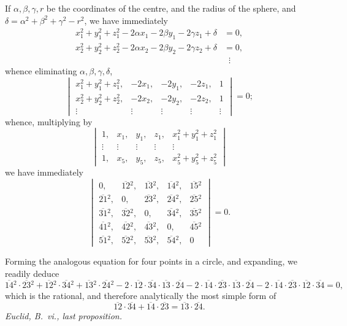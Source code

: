 \documentclass[11pt]{article}
\begin{document}
If $\alpha, \beta, \gamma, r$ be the coordinates of the centre, and the radius of the sphere, and $\delta = \alpha^2 + \beta^2 + \gamma^2 - r^2$, we have immediately
\[
\begin{aligned}
x_1^2 + y_1^2 + z_1^2 - 2\alpha x_1 - 2\beta y_1 - 2\gamma z_1 + \delta &= 0, \\
x_2^2 + y_2^2 + z_2^2 - 2\alpha x_2 - 2\beta y_2 - 2\gamma z_2 + \delta &= 0, \\
&\;\;\vdots
\end{aligned}
\]
whence eliminating $\alpha, \beta, \gamma, \delta$,
\[
\begin{vmatrix}
x_1^2 + y_1^2 + z_1^2, & -2x_1, & -2y_1, & -2z_1, & 1 \\
x_2^2 + y_2^2 + z_2^2, & -2x_2, & -2y_2, & -2z_2, & 1 \\
\vdots & \vdots & \vdots & \vdots & \vdots
\end{vmatrix} = 0;
\]
whence, multiplying by
\[
\begin{vmatrix}
1, & x_1, & y_1, & z_1, & x_1^2 + y_1^2 + z_1^2 \\
\vdots & \vdots & \vdots & \vdots & \vdots \\
1, & x_5, & y_5, & z_5, & x_5^2 + y_5^2 + z_5^2
\end{vmatrix}
\]
we have immediately
\[
\begin{vmatrix}
0, & \overline{12}{}^2, & \overline{13}{}^2, & \overline{14}{}^2, & \overline{15}{}^2 \\
\overline{21}{}^2, & 0, & \overline{23}{}^2, & \overline{24}{}^2, & \overline{25}{}^2 \\
\overline{31}{}^2, & \overline{32}{}^2, & 0, & \overline{34}{}^2, & \overline{35}{}^2 \\
\overline{41}{}^2, & \overline{42}{}^2, & \overline{43}{}^2, & 0, & \overline{45}{}^2 \\
\overline{51}{}^2, & \overline{52}{}^2, & \overline{53}{}^2, & \overline{54}{}^2, & 0
\end{vmatrix} = 0.
\]

Forming the analogous equation for four points in a circle, and expanding, we readily deduce
\[
\overline{14}{}^2\cdot\overline{23}{}^2 + \overline{12}{}^2\cdot\overline{34}{}^2 + \overline{13}{}^2\cdot\overline{24}{}^2
- 2\cdot\overline{12}\cdot\overline{34}\cdot\overline{13}\cdot\overline{24}
- 2\cdot\overline{14}\cdot\overline{23}\cdot\overline{13}\cdot\overline{24}
- 2\cdot\overline{14}\cdot\overline{23}\cdot\overline{12}\cdot\overline{34} = 0,
\]
which is the rational, and therefore analytically the most simple form of
\[
\overline{12}\cdot\overline{34} + \overline{14}\cdot\overline{23} = \overline{13}\cdot\overline{24}.
\]
\hfill\textit{Euclid, B.~vi., last proposition.}
\end{document}
